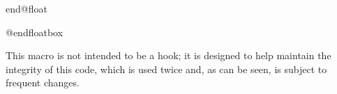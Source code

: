 \begin{docCommand}{end@float}{}
\end{docCommand}

    \begin{teX}
\def\end@float{%
  \@endfloatbox
  \ifnum\@floatpenalty <\z@
    \end{teX}
 We make sure that we never exceed |\textheight|, otherwise float
 will never get typeset (91/03/15 FMi).
    \begin{teX}
    \@largefloatcheck
    \@cons\@currlist\@currbox
    \ifnum\@floatpenalty <-\@Mii
      \penalty -\@Miv
    \end{teX}
 Saving and restoring |\prevdepth| added 26 May 87 to prevent extra
 vertical space when used in vertical mode.
    \begin{teX}
      \@tempdima\prevdepth
      \vbox{}%
      \prevdepth\@tempdima
    \end{teX}

    \begin{teX}
      \penalty\@floatpenalty
    \end{teX}
 
    \begin{teX}
    \else
      \vadjust{\penalty -\@Miv \vbox{}\penalty\@floatpenalty}\@Esphack
    \fi
  \fi
}
    \end{teX}
 

 \begin{macro}{\end@dblfloat}
    \begin{teX}
\def\end@dblfloat{%
\if@twocolumn
  \@endfloatbox
  \ifnum\@floatpenalty <\z@
    \end{teX}
 We make sure that we never exceed |\textheight|, otherwise float
 will never get typeset (91/03/15 FMi).
    \begin{teX}
    \@largefloatcheck
    \@cons\@dbldeferlist\@currbox
  \fi
    \end{teX}
 RmS 92/03/18 changed |\@esphack| to |\@Esphack|.
    \begin{teX}
    \ifnum \@floatpenalty =-\@Mii \@Esphack\fi
\else
  \end@float
\fi
}
    \end{teX}
 \end{macro}
 
 
 
\begin{docCommand}{@endfloatbox}{ }
\end{docCommand}

    This macro is not intended to be a hook; it is designed to help
    maintain the integrity of this code, which is used twice and, as
    can be seen, is subject to frequent changes.
    \begin{teX}
\def \@endfloatbox{%
      \par\vskip\z@skip      %
    \end{teX}
   

